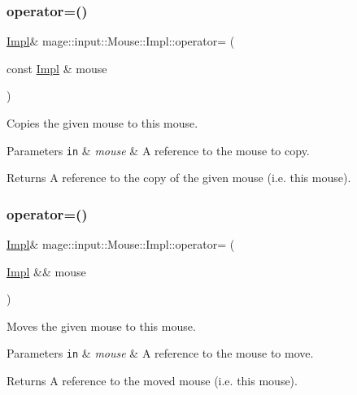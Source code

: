 \subsubsection{\texorpdfstring{operator=()}{operator=()}\hspace{0.1cm}{\footnotesize\ttfamily [1/2]}}
{\footnotesize\ttfamily \hyperlink{classmage_1_1input_1_1_mouse_1_1_impl}{Impl}\& mage\+::input\+::\+Mouse\+::\+Impl\+::operator= (\begin{DoxyParamCaption}\item[{const \hyperlink{classmage_1_1input_1_1_mouse_1_1_impl}{Impl} \&}]{mouse }\end{DoxyParamCaption})\hspace{0.3cm}{\ttfamily [delete]}}

Copies the given mouse to this mouse.


\begin{DoxyParams}[1]{Parameters}
\mbox{\tt in}  & {\em mouse} & A reference to the mouse to copy. \\
\hline
\end{DoxyParams}
\begin{DoxyReturn}{Returns}
A reference to the copy of the given mouse (i.\+e. this mouse). 
\end{DoxyReturn}
\hypertarget{classmage_1_1input_1_1_mouse_1_1_impl_ae994602de981918d84a0b836a403f941}{}\label{classmage_1_1input_1_1_mouse_1_1_impl_ae994602de981918d84a0b836a403f941} 
\subsubsection{\texorpdfstring{operator=()}{operator=()}\hspace{0.1cm}{\footnotesize\ttfamily [2/2]}}
{\footnotesize\ttfamily \hyperlink{classmage_1_1input_1_1_mouse_1_1_impl}{Impl}\& mage\+::input\+::\+Mouse\+::\+Impl\+::operator= (\begin{DoxyParamCaption}\item[{\hyperlink{classmage_1_1input_1_1_mouse_1_1_impl}{Impl} \&\&}]{mouse }\end{DoxyParamCaption})\hspace{0.3cm}{\ttfamily [delete]}}

Moves the given mouse to this mouse.


\begin{DoxyParams}[1]{Parameters}
\mbox{\tt in}  & {\em mouse} & A reference to the mouse to move. \\
\hline
\end{DoxyParams}
\begin{DoxyReturn}{Returns}
A reference to the moved mouse (i.\+e. this mouse). 
\end{DoxyReturn}
\hypertarget{classmage_1_1input_1_1_mouse_1_1_impl_a572b3d4c288bb91d07dc2ae1d57b6e3d}{}\label{classmage_1_1input_1_1_mouse_1_1_impl_a572b3d4c288bb91d07dc2ae1d57b6e3d} 
